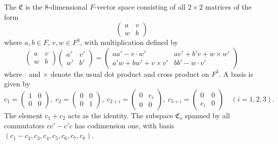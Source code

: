 The  $\mathfrak{C}$ is the 8-dimensional $F$-vector space consisting of all $2 \times 2$ matrices of the form
$$\begin{pmatrix} a & v \\ w & b \end{pmatrix}$$
where $a, b \in F$, $v, w \in F^3$, with multiplication defined by
$$\begin{pmatrix} a & v \\ w & b \end{pmatrix} \begin{pmatrix} a' & v' \\ w' & b' \end{pmatrix} =
\begin{pmatrix} aa' - v \cdot w' & av' + b'v + w \times w' \\ a'w + bw' + v \times v' & bb' - w \cdot v' \end{pmatrix}$$
where $\cdot$ and $\times$ denote the usual dot product and cross product on $F^3$. A basis is given by
$$c_1 = \begin{pmatrix} 1 & 0 \\ 0 & 0 \end{pmatrix},\; c_2 = \begin{pmatrix} 0 & 0 \\ 0 & 1 \end{pmatrix},\;
c_{2+i} = \begin{pmatrix} 0 & e_i \\ 0 & 0 \end{pmatrix},\; c_{5+i} = \begin{pmatrix} 0 & 0 \\ e_i & 0 \end{pmatrix}\quad(i=1,2,3).$$
The element $c_1 + c_2$ acts as the identity. The subspace $\mathfrak{C}_o$ spanned by all commutators $cc' - c'c$ has codimension one, with basis $(c_1 - c_2, c_3, c_4, c_5, c_6, c_7, c_8)$.
